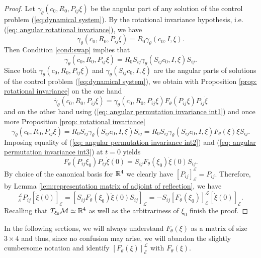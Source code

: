 \begin{proof}
Let $\gamma_\theta(c_0, R_0, P_{ij}\xi)$ be the angular part of any solution of the control problem (\ref{eq:dynamical system}). By the rotational invariance hypothesis, i.e. (\ref{eq: angular rotational invariance}), we have
\begin{equation}
	\gamma_\theta(c_0, R_0, P_{ij}\xi) = R_0 \gamma_\theta(c_0, I, \xi).
\end{equation}
Then Condition \ref{cond:swap} implies that
\begin{equation}
\label{eq: angular permutation invariance int1}
	\gamma_\theta(c_0, R_0,P_{ij} \xi) = R_0 S_{ij} \gamma_\theta(S_{ij}c_0, I, \xi) S_{ij}.
\end{equation}
Since both $\gamma_\theta(c_0, R_0, P_{ij} \xi)$ and $\gamma_\theta(S_{ij} c_0, I, \xi)$ are the angular parts of solutions of the control problem (\ref{eq:dynamical system}), we obtain with Proposition \ref{prop: rotational invariance} on the one hand
\begin{equation}
\label{eq: angular permutation invariance int2}
	\dot{\gamma_\theta}(c_0, R_0, P_{ij} \xi)= \gamma_\theta(c_0, R_0, P_{ij} \xi) F_{\theta}(P_{ij} \xi) P_{ij } \dot{\xi}
\end{equation}
and on the other hand using (\ref{eq: angular permutation invariance int1}) and once more Proposition \ref{prop: rotational invariance}
\begin{equation}
\label{eq: angular permutation invariance int3}
	\dot{\gamma_\theta}(c_0, R_0, P_{ij} \xi) =  R_0 S_{ij} \dot{\gamma_\theta}(S_{ij} c_0, I, \xi) S_{ij} = R_0 S_{ij} \gamma_\theta(S_{ij} c_0, I, \xi) F_{\theta}(\xi) \dot{\xi} S_{ij}.
\end{equation}
Imposing equality of (\ref{eq: angular permutation invariance int2}) and (\ref{eq: angular permutation invariance int3}) at $t = 0$ yields
\begin{equation}
	F_{\theta}(P_{ij} \xi_0) P_{ij}  \dot{\xi}(0) = S_{ij} F_{\theta}(\xi_0) \dot{\xi}(0) S_{ij}.
\end{equation}
By choice of the canonical basis for $\mathbb{R}^4$ we clearly have $[P_{ij}]_{\mathcal{E}}^{\mathcal{E}} = P_{ij}$. Therefore, by Lemma \ref{lem:representation matrix of adjoint of reflection}, we have
\begin{equation}
	[F_{\theta}(P_{ij} \xi_0)]_{\mathcal{E}}^{\mathcal{L}}  P_{ij} [\dot{\xi}(0)]_{\mathcal{E}} = [S_{ij} F_{\theta}(\xi_0) \dot{\xi}(0) S_{ij}]_{\mathcal{L}} = -S_{ij} [F_{\theta}(\xi_0)]_{\mathcal{E}}^{\mathcal{L}} [\dot{\xi}(0)]_{\mathcal{E}}.
\end{equation}
Recalling that $T_{\xi_0} \mathcal{M} \simeq \mathbb{R}^4$ as well as the arbitrariness of $\xi_0$ finish the proof.
\end{proof}

In the following sections, we will always understand $F_{\theta}(\xi)$ as a matrix of size $3 \times 4$ and thus, since no confusion may arise, we will abandon the slightly cumbersome notation and identify $[F_{\theta}(\xi)]_{\mathcal{E}}^{\mathcal{L}}$ with $F_{\theta}(\xi)$.





